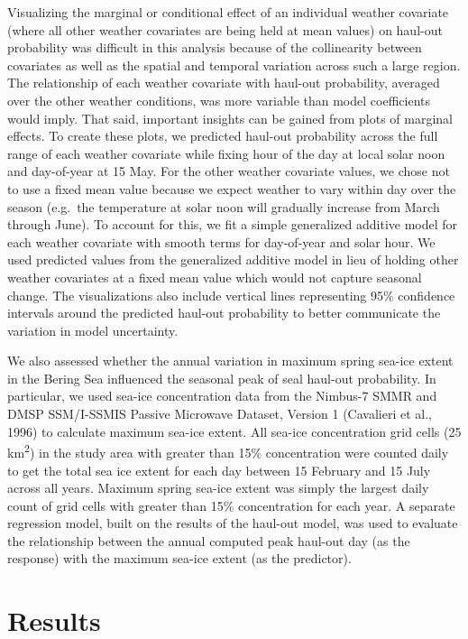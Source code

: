 \documentclass[fleqn,10pt,lineno]{wlpeerj} %
\begin{document}
Visualizing the marginal or conditional effect of an individual weather
covariate (where all other weather covariates are being held at mean values) on
haul-out probability was difficult in this analysis because of the collinearity
between covariates as well as the spatial and temporal variation across such a
large region. The relationship of each weather covariate with haul-out
probability, averaged over the other weather conditions, was more variable than
model coefficients would imply. That said, important insights can be gained from
plots of marginal effects. To create these plots, we predicted haul-out
probability across the full range of each weather covariate while fixing hour
of the day at local solar noon and day-of-year at 15 May. For the other weather
covariate values, we chose not to use a fixed mean value because we expect weather
to vary within day over the season (e.g.~the temperature at solar noon will
gradually increase from March through June). To account for this, we fit a simple generalized
additive model for each weather covariate with smooth terms for day-of-year and
solar hour. We used predicted values from the generalized additive model in lieu
of holding other weather covariates at a fixed mean value which would not capture
seasonal change. The visualizations
also include vertical lines representing 95\% confidence intervals around the
predicted haul-out probability to better communicate the variation in model
uncertainty.

We also assessed whether the annual variation in maximum spring sea-ice extent in the
Bering Sea influenced the seasonal peak of seal haul-out probability. In
particular, we used sea-ice concentration data from the Nimbus-7 SMMR and DMSP
SSM/I-SSMIS Passive Microwave Dataset, Version 1 (Cavalieri et al., 1996) to calculate
maximum sea-ice extent. All sea-ice concentration grid cells (25 km\textsuperscript{2}) in the
study area with greater than 15\% concentration were counted daily to get the total sea
ice extent for each day between 15 February and 15 July across all years.
Maximum spring sea-ice extent was simply the largest daily count of grid cells
with greater than 15\% concentration for each year. A separate regression model,
built on the results of the haul-out model, was used to evaluate the relationship
between the annual computed peak haul-out day (as the response) with the
maximum sea-ice extent (as the predictor).

\section*{Results}\label{results}
\end{document}
